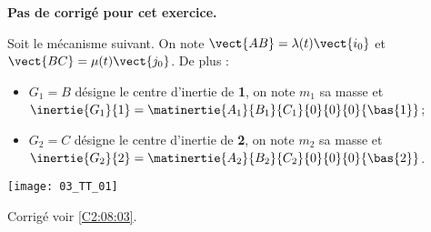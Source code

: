 \normaltrue
\correctionfalse



\setcounter{question}{0}
\ifcorrection
\else
\textbf{Pas de corrigé pour cet exercice.}
\fi

\ifprof
\else
Soit le mécanisme suivant. On note $\vect{AB}=\lambda(t)\vect{i_0}$ et $\vect{BC}=\mu(t)\vect{j_0}$. De plus :
\begin{itemize}
\item $G_1 = B$ désigne le centre d'inertie de \textbf{1}, on note $m_1$ sa masse et $\inertie{G_1}{1}=\matinertie{A_1}{B_1}{C_1}{0}{0}{0}{\bas{1}}$; 
\item $G_2 = C$ désigne le centre d'inertie de \textbf{2}, on note $m_2$ sa masse et $\inertie{G_2}{2}=\matinertie{A_2}{B_2}{C_2}{0}{0}{0}{\bas{2}}$.
\end{itemize}
\begin{center}
\texttt{[image: 03\_TT\_01]}
\end{center}
\fi

\ifprof
\else
\fi

\ifprof
\else
\fi

\ifprof
\else
\fi

\ifprof
\else
\begin{flushright}
\footnotesize{Corrigé  voir \ref{C2:08:03}.}
\end{flushright}%
\fi